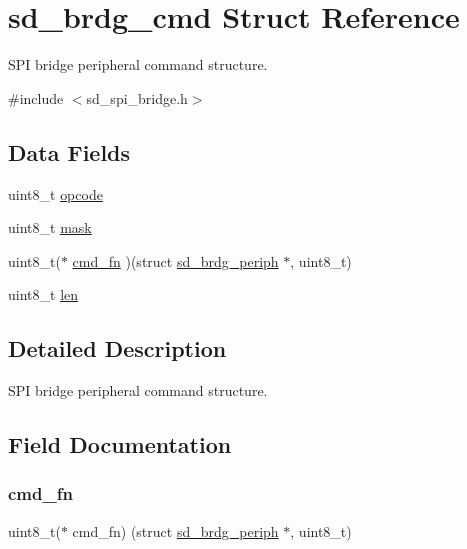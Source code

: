 \hypertarget{structsd__brdg__cmd}{}\section{sd\+\_\+brdg\+\_\+cmd Struct Reference}
\label{structsd__brdg__cmd}


S\+PI bridge peripheral command structure.  




{\ttfamily \#include $<$sd\+\_\+spi\+\_\+bridge.\+h$>$}

\subsection*{Data Fields}
\begin{DoxyCompactItemize}
\item 
uint8\+\_\+t \mbox{\hyperlink{structsd__brdg__cmd_a5c1b56e6bccc2a95dbddf1a08e56e87d}{opcode}}
\item 
uint8\+\_\+t \mbox{\hyperlink{structsd__brdg__cmd_a8a74907784be6c7786c2d060c8d7e10b}{mask}}
\item 
uint8\+\_\+t($\ast$ \mbox{\hyperlink{structsd__brdg__cmd_a427304e1c3947f63681282f9968df716}{cmd\+\_\+fn}} )(struct \mbox{\hyperlink{structsd__brdg__periph}{sd\+\_\+brdg\+\_\+periph}} $\ast$, uint8\+\_\+t)
\item 
uint8\+\_\+t \mbox{\hyperlink{structsd__brdg__cmd_a5723e60ffd628510c699eddbce90be23}{len}}
\end{DoxyCompactItemize}


\subsection{Detailed Description}
S\+PI bridge peripheral command structure. 

\subsection{Field Documentation}
\mbox{\label{structsd__brdg__cmd_a427304e1c3947f63681282f9968df716}} 
\subsubsection{\texorpdfstring{cmd\+\_\+fn}{cmd\_fn}}
{\footnotesize\ttfamily uint8\+\_\+t($\ast$ cmd\+\_\+fn) (struct \mbox{\hyperlink{structsd__brdg__periph}{sd\+\_\+brdg\+\_\+periph}} $\ast$, uint8\+\_\+t)}

